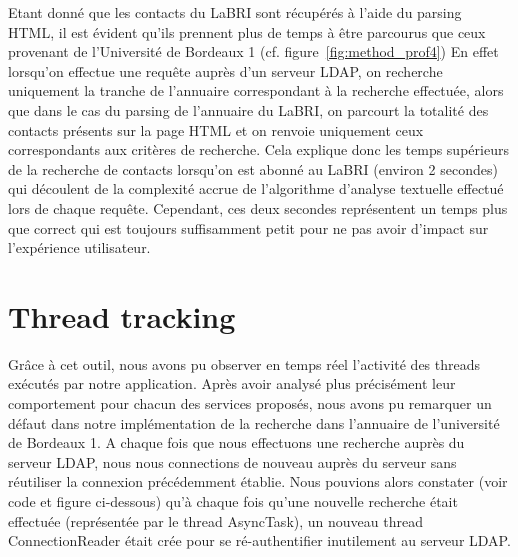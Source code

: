 Etant donné que les contacts du LaBRI sont récupérés à l'aide du parsing HTML, il est évident qu'ils prennent plus de temps à être parcourus que ceux provenant de l'Université de Bordeaux 1 (cf. figure~\ref{fig:method_prof4}) En effet lorsqu'on effectue une requête auprès d'un serveur LDAP, on recherche uniquement la tranche de l'annuaire correspondant à la recherche effectuée, alors que dans le cas du parsing de l'annuaire du LaBRI, on parcourt la totalité des contacts présents sur la page HTML et on renvoie uniquement ceux correspondants aux critères de recherche. Cela explique donc les temps supérieurs de la recherche de contacts lorsqu'on est abonné au LaBRI (environ 2 secondes) qui découlent de la complexité accrue de l'algorithme d'analyse textuelle effectué lors de chaque requête. Cependant, ces deux secondes représentent un temps plus que correct qui est toujours suffisamment petit pour ne pas avoir d'impact sur l'expérience utilisateur.


\section{Thread tracking}
Grâce à cet outil, nous avons pu observer en temps réel l’activité des threads exécutés par notre application. Après avoir analysé plus précisément leur comportement pour chacun des services proposés, nous avons pu remarquer un défaut dans notre implémentation de la recherche dans l’annuaire de l’université de Bordeaux 1. A chaque fois que nous effectuons une recherche auprès du serveur LDAP, nous nous connections de nouveau auprès du serveur sans réutiliser la connexion précédemment établie. Nous pouvions alors constater (voir code et figure ci-dessous) qu’à chaque fois qu’une nouvelle recherche était effectuée (représentée par le thread AsyncTask), un nouveau thread ConnectionReader  était crée pour se ré-authentifier inutilement au serveur LDAP.

\begin{figure}[h!]
  \label{fig:without_pool_code}
  \center
  \setlength\fboxsep{5pt}
  \setlength\fboxrule{0.5pt}
\end{figure}

\begin{figure}[h!]
  \label{fig:without_pool}
  \center
  \setlength\fboxsep{5pt}
  \setlength\fboxrule{0.5pt}
\end{figure}

